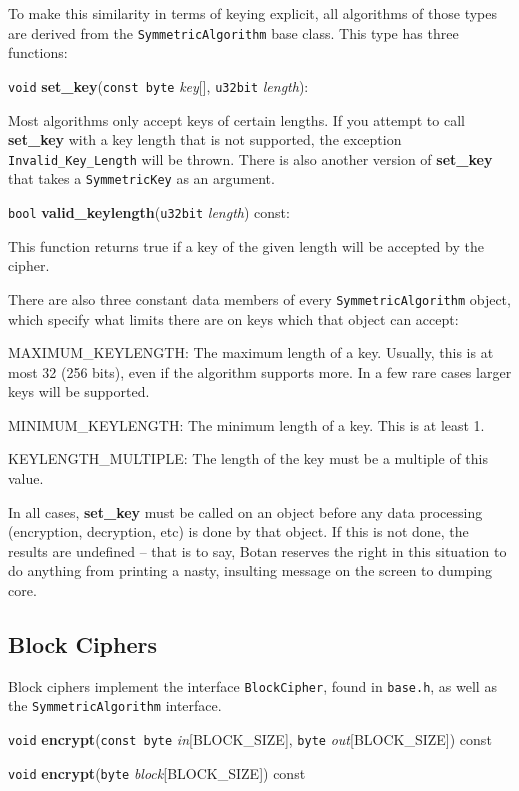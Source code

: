 \documentclass{article}
\newcommand{\filename}[1]{\texttt{#1}}
\newcommand{\function}[1]{\textbf{#1}}
\newcommand{\type}[1]{\texttt{#1}}
\renewcommand{\arg}[1]{\textsl{#1}}
\begin{document}
To make this similarity in terms of keying explicit, all algorithms of
those types are derived from the \type{SymmetricAlgorithm} base
class. This type has three functions:

\noindent
\type{void} \function{set\_key}(\type{const byte} \arg{key}[], \type{u32bit}
\arg{length}):

Most algorithms only accept keys of certain lengths. If you attempt to call
\function{set\_key} with a key length that is not supported, the exception
\type{Invalid\_Key\_Length} will be thrown. There is also another version of
\function{set\_key} that takes a \type{SymmetricKey} as an argument.

\noindent
\type{bool} \function{valid\_keylength}(\type{u32bit} \arg{length}) const:

This function returns true if a key of the given length will be accepted by
the cipher.

There are also three constant data members of every
\type{SymmetricAlgorithm} object, which specify what limits there are
on keys which that object can accept:

MAXIMUM\_KEYLENGTH: The maximum length of a key. Usually, this is at
most 32 (256 bits), even if the algorithm supports more. In a few rare
cases larger keys will be supported.

MINIMUM\_KEYLENGTH: The minimum length of a key. This is at least 1.

KEYLENGTH\_MULTIPLE: The length of the key must be a multiple of this value.

In all cases, \function{set\_key} must be called on an object before any data
processing (encryption, decryption, etc) is done by that object. If this is not
done, the results are undefined -- that is to say, Botan reserves the right in
this situation to do anything from printing a nasty, insulting message on the
screen to dumping core.

\subsection{Block Ciphers}

Block ciphers implement the interface \type{BlockCipher}, found in
\filename{base.h}, as well as the \type{SymmetricAlgorithm} interface.

\noindent
\type{void} \function{encrypt}(\type{const byte} \arg{in}[BLOCK\_SIZE],
                               \type{byte} \arg{out}[BLOCK\_SIZE]) const

\noindent
\type{void} \function{encrypt}(\type{byte} \arg{block}[BLOCK\_SIZE]) const
\end{document}
